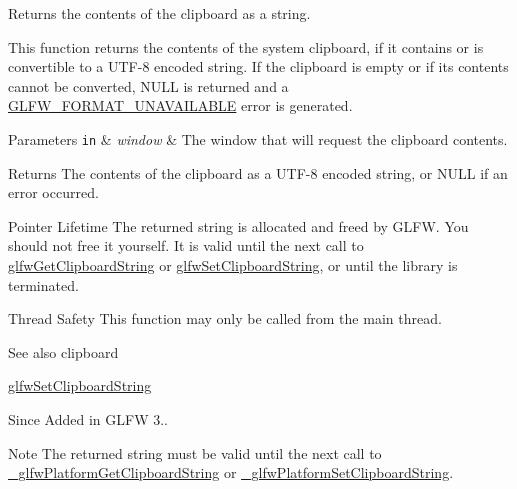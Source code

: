 Returns the contents of the clipboard as a string. 

This function returns the contents of the system clipboard, if it contains or is convertible to a U\+T\+F-\/8 encoded string. If the clipboard is empty or if its contents cannot be converted, {\ttfamily N\+U\+L\+L} is returned and a \hyperlink{group__errors_ga196e125ef261d94184e2b55c05762f14}{G\+L\+F\+W\+\_\+\+F\+O\+R\+M\+A\+T\+\_\+\+U\+N\+A\+V\+A\+I\+L\+A\+B\+L\+E} error is generated.


\begin{DoxyParams}[1]{Parameters}
\mbox{\tt in}  & {\em window} & The window that will request the clipboard contents. \\
\hline
\end{DoxyParams}
\begin{DoxyReturn}{Returns}
The contents of the clipboard as a U\+T\+F-\/8 encoded string, or {\ttfamily N\+U\+L\+L} if an error occurred.
\end{DoxyReturn}
\begin{DoxyParagraph}{Pointer Lifetime}
The returned string is allocated and freed by G\+L\+F\+W. You should not free it yourself. It is valid until the next call to \hyperlink{group__input_ga3ac90c8bbaf0b46063bb02b574f3b6f7}{glfw\+Get\+Clipboard\+String} or \hyperlink{group__input_ga7a580309bbc185a0459c3559021d2fd7}{glfw\+Set\+Clipboard\+String}, or until the library is terminated.
\end{DoxyParagraph}
\begin{DoxyParagraph}{Thread Safety}
This function may only be called from the main thread.
\end{DoxyParagraph}
\begin{DoxySeeAlso}{See also}
clipboard 

\hyperlink{group__input_ga7a580309bbc185a0459c3559021d2fd7}{glfw\+Set\+Clipboard\+String}
\end{DoxySeeAlso}
\begin{DoxySince}{Since}
Added in G\+L\+F\+W 3..
\end{DoxySince}
\begin{DoxyNote}{Note}
The returned string must be valid until the next call to \hyperlink{group__platform_ga8a498c1b06756ed10baed476e2b0ffc5}{\+\_\+glfw\+Platform\+Get\+Clipboard\+String} or \hyperlink{group__platform_gabf3b7b168b64bb1abbfc17e93d0c5014}{\+\_\+glfw\+Platform\+Set\+Clipboard\+String}. 
\end{DoxyNote}
\hypertarget{group__platform_ga5729dba637d75f8e80b477c01a609284}{}
